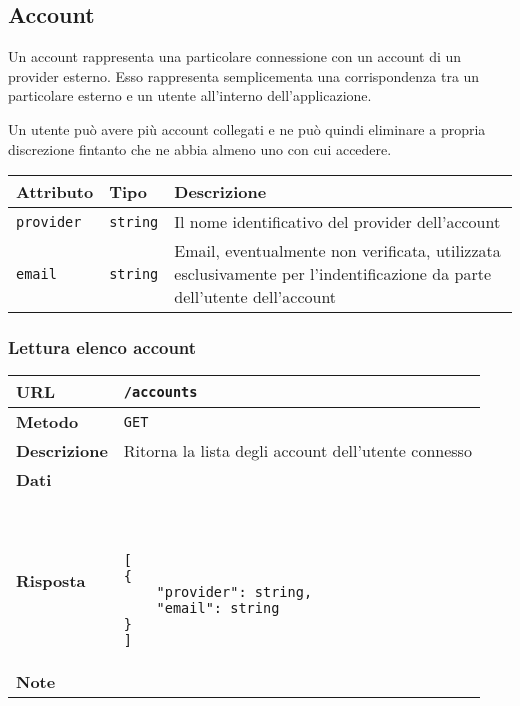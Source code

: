 \subsection{Account}

    \par Un account rappresenta una particolare connessione con un account di un 
    provider esterno. Esso rappresenta semplicementa una corrispondenza tra
    un particolare esterno e un utente all'interno dell'applicazione.

    \par Un utente può avere più account collegati e ne può quindi eliminare
    a propria discrezione fintanto che ne abbia almeno uno con cui accedere.

    \begin{center}
        \begin{tabular}{ | l | l | l | } 
        \hline
            Attributo & Tipo & Descrizione \\
        \hline
            \texttt{provider} & \texttt{string} & 
                Il nome identificativo del provider dell'account \\
            \texttt{email} & \texttt{string} & 
                Email, eventualmente non verificata, utilizzata esclusivamente
                per l'indentificazione da parte dell'utente dell'account \\
        \hline
        \end{tabular}
    \end{center}

    \subsubsection{Lettura elenco account}

        \begin{tabular}{|l|l|} 
            \hline
            \textbf{URL} & \texttt{/accounts} \\ \hline
            \textbf{Metodo} & \texttt{GET} \\ \hline
            \textbf{Descrizione} & 
                Ritorna la lista degli account dell'utente connesso \\ \hline
            \textbf{Dati} & \\ \hline
            \textbf{Risposta} & \
                \begin{lstlisting}[basicstyle={\ttfamily}]
[
{
    "provider": string,
    "email": string
}
]
                \end{lstlisting} \\ \hline
            \textbf{Note} & \\ \hline
        \end{tabular}

